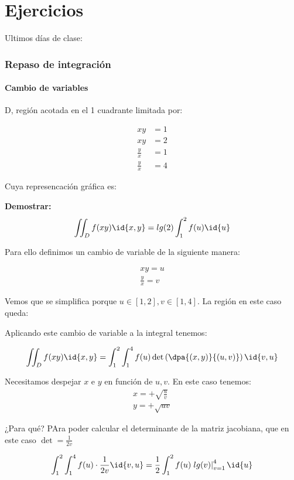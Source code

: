 \chapter{Ejercicios}

Ultimos días de clase:
\subsection{Repaso de integración}
\subsubsection{Cambio de variables}

D, región acotada en el 1 cuadrante limitada por:

\[\begin{array}{cc}
xy&=1\\xy&=2\\\frac{y}{x} &=1\\\frac{y}{x}&=4
\end{array}\]

Cuya represencación gráfica es:


\textbf{Demostrar:}\[\iint_D f(xy)\id{x,y} = lg(2)\int_1^2f(u)\id{u}\]

Para ello definimos un cambio de variable de la siguiente manera:

\begin{gather*}
xy=u\\
\frac{y}{x}=v
\end{gather*}

Vemos que se simplifica porque $u\in[1,2],v\in[1,4]$. La región en este caso queda:


Aplicando este cambio de variable a la integral tenemos:

\[\iint_D f(xy)\id{x,y} = \int_1^2\int_1^4 f(u) \det \left(\dpa{(x,y)}{(u,v)}\right)\id{v,u}\]

Necesitamos despejar $x$ e $y$ en función de $u,v$. En este caso tenemos: 
\begin{gather*}
x=+\sqrt{\frac{u}{v}}\\ y= + \sqrt{uv}
\end{gather*}

¿Para qué? PAra poder calcular el determinante de la matriz jacobiana, que en este caso $\displaystyle\det = \frac{1}{2v}$

\[\int_1^2\int_1^4 f(u)\cdot  \frac{1}{2v}\id{v,u} = \frac{1}{2} \int_1^2 f(u) \left.lg(v)\right|_{v=1}^4 \id{u}\]

